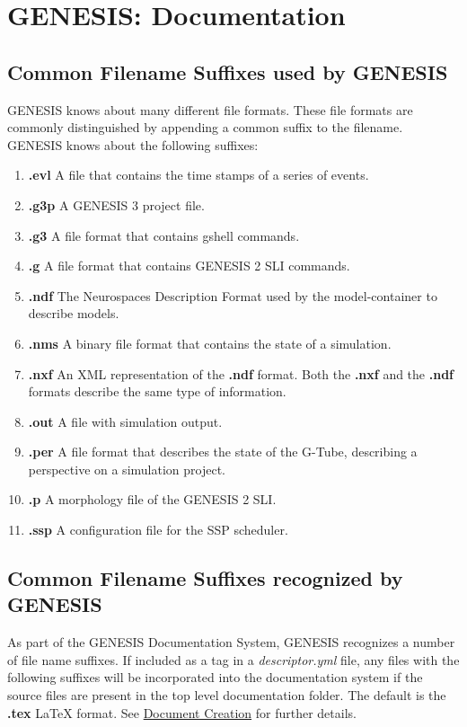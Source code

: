 \documentclass[12pt]{article}
\begin{document}
\section*{GENESIS: Documentation}

\subsection*{Common Filename Suffixes used by GENESIS}

GENESIS knows about many different file formats.  These file formats
are commonly distinguished by appending a common suffix to the
filename.  GENESIS knows about the following suffixes:

\begin{enumerate}

\item {\bf .evl} A file that contains the time stamps of a series of events.
\item {\bf .g3p} A GENESIS 3 project file.
\item {\bf .g3} A file format that contains gshell commands.
\item {\bf .g} A file format that contains GENESIS 2 SLI commands.
\item {\bf .ndf} The Neurospaces Description Format used by the model-container to describe models.
\item {\bf .nms} A binary file format that contains the state of a simulation.
\item {\bf .nxf} An XML representation of the {\bf .ndf} format.  Both the {\bf .nxf} and the {\bf .ndf} formats describe the same type of information.
\item {\bf .out} A file with simulation output.
\item {\bf .per} A file format that describes the state of the G-Tube, describing a perspective on a simulation project.
\item {\bf .p} A morphology file of the GENESIS 2 SLI.
\item {\bf .ssp} A configuration file for the SSP scheduler.

\end{enumerate}

\subsection*{Common Filename Suffixes recognized by GENESIS}
As part of the GENESIS Documentation System, GENESIS recognizes a number of file name suffixes. If included as a tag in a {\it descriptor.yml} file, any files with the following suffixes will be incorporated into the documentation system if the source files are present in the top level documentation folder. The default is the {\bf .tex} \LaTeX\,\,format. See \href{../document-create/document-create.tex}{Document Creation} for further details.
\end{document}
